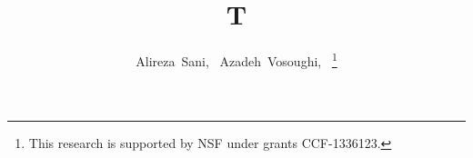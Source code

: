\documentclass[journal]{IEEEtran}
\begin{document}
\author{Alireza~Sani,~
        Azadeh~Vosoughi,~%
\thanks{This research is supported by NSF under grants CCF-1336123.}%
}
\title{T}\maketitle
\end{document}
